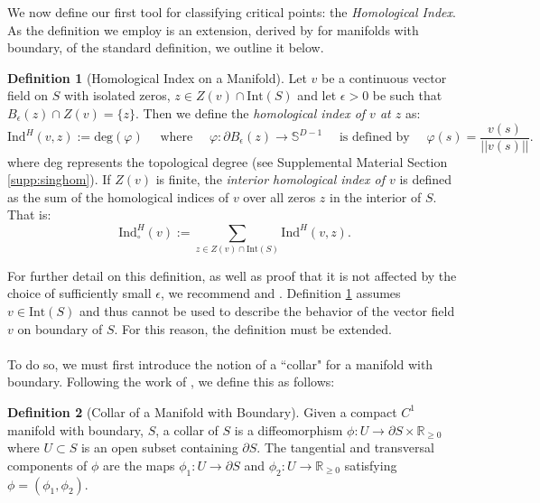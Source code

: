\documentclass[11pt]{article}
\newcommand{\1}{\mathbf{1}}
\theoremstyle{definition}
\newtheorem{defn}{Definition}%
\theoremstyle{remark}
\begin{document}
We now define our first tool for classifying critical points: the \textit{Homological Index}. As the definition we employ is an extension, derived by \cite{jubin2009generalized} for manifolds with boundary, of the standard definition, we outline it below.
\begin{mdframed}
    \begin{defn}[Homological Index on a Manifold]\label{def:homological_index_mfld} Let $v$ be a continuous vector field on $S$ with isolated zeros, $z \in Z(v)\cap \text{Int}(S)$ and let $\epsilon > 0$ be such that $B_\epsilon(z) \cap Z(v)=\{z\}$. Then we define the \textit{homological index of $v$ at $z$} as:
    \begin{equation}\nonumber
        \text{Ind}^H(v,z):= \text{deg}(\varphi) \quad \text{ where } \quad \varphi:\partial B_\epsilon(z)\rightarrow\mathbb{S}^{D-1}\quad  \text{ is defined by }\quad \varphi(s)=\frac{v(s)}{||v(s)||}.
    \end{equation} 
    where deg represents the topological degree (see Supplemental Material Section \ref{supp:singhom}). If $Z(v)$ is finite, the \textit{interior homological index of $v$} is defined as the sum of the homological indices of $v$ over all zeros $z$ in the interior of $S$. That is:
    \begin{equation}\nonumber
        \text{Ind}^H_\circ(v):= \sum_{z \in Z(v) \cap \text{Int}(S)} \text{Ind}^H(v,z).
    \end{equation}
    \end{defn}
    \vspace{0.1cm}
\end{mdframed}
For further detail on this definition, as well as proof that it is not affected by the choice of sufficiently small $\epsilon$, we recommend \cite{lee2010topological} and \cite{guillemin2010differential}. Definition \ref{def:homological_index_mfld} assumes $v\in \text{Int}(S)$ and thus cannot be used to describe the behavior of the vector field $v$ on boundary of $S$. For this reason, the definition must be extended. \\
\\
To do so, we must first introduce the notion of a ``collar" for a manifold with boundary. Following the work of \cite{jubin2009generalized}, we define this as follows:
\begin{mdframed}
    \begin{defn}[Collar of a Manifold with Boundary] Given a compact $C^1$ manifold with boundary, $S$, a collar of $S$ is a diffeomorphism $\phi:U \rightarrow \partial S \times \mathbb{R}_{\geq 0}$ where $U\subset S$ is an open subset containing $\partial S$. The tangential and transversal components of $\phi$ are the maps $\phi_1:U\rightarrow \partial S$ and $\phi_2:U\rightarrow \mathbb{R}_{\geq 0}$ satisfying $\phi=(\phi_1,\phi_2)$. 
    \end{defn}
    \vspace{0.2cm}
\end{mdframed}
\end{document}
